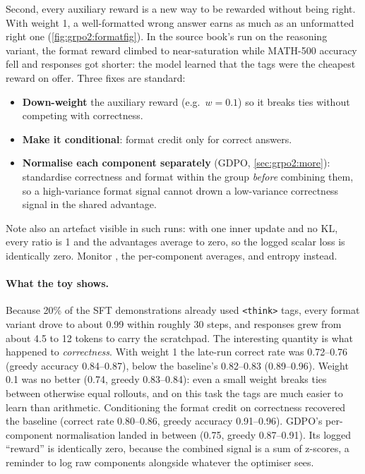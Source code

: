 Second, every auxiliary reward is a new way to be rewarded without being right. With weight 1,
a well-formatted wrong answer earns as much as an unformatted right one
(\cref{fig:grpo2:formatfig}). In the source book's run on the reasoning variant, the format
reward climbed to near-saturation while MATH-500 accuracy fell and responses got shorter: the
model learned that the tags were the cheapest reward on offer. Three fixes are standard:
\begin{itemize}
\item \textbf{Down-weight} the auxiliary reward (e.g.\ $w=0.1$) so it breaks ties without
competing with correctness.
\item \textbf{Make it conditional}: format credit only for correct answers.
\item \textbf{Normalise each component separately} (GDPO, \cref{sec:grpo2:more}): standardise
correctness and format within the group \emph{before} combining them, so a high-variance
format signal cannot drown a low-variance correctness signal in the shared advantage.
\end{itemize}
Note also an artefact visible in such runs: with one inner update and no KL, every ratio is 1
and the advantages average to zero, so the logged scalar loss is identically zero. Monitor
, the per-component averages,  and entropy instead.

\paragraph{What the toy shows.} Because 20\% of the SFT demonstrations already used
\verb|<think>| tags, every format variant drove  to about 0.99 within
roughly 30 steps, and responses grew from about 4.5 to 12 tokens to carry the scratchpad. The
interesting quantity is what happened to \emph{correctness}. With weight 1 the late-run
correct rate was 0.72--0.76 (greedy accuracy 0.84--0.87), below the baseline's 0.82--0.83
(0.89--0.96). Weight 0.1 was no better (0.74, greedy 0.83--0.84): even a small weight breaks
ties between otherwise equal rollouts, and on this task the tags are much easier to learn
than arithmetic. Conditioning the format credit on correctness recovered the baseline
(correct rate 0.80--0.86, greedy accuracy 0.91--0.96). GDPO's per-component normalisation
landed in between (0.75, greedy 0.87--0.91). Its logged ``reward'' is identically zero,
because the combined signal is a sum of z-scores, a reminder to log raw components alongside
whatever the optimiser sees.


